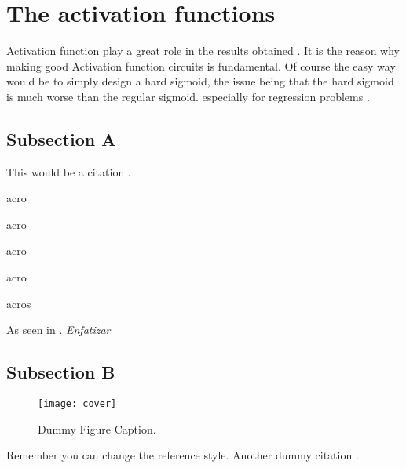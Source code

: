 \section{The activation functions}
\label{sec:af}

Activation function play a great role in the results obtained \cite{af}. It is the reason why making good Activation function circuits is fundamental. Of course the easy way would be to simply design a hard sigmoid, the issue being that the hard sigmoid is much worse than the regular sigmoid. especially for regression problems \cite{hardSigm}.

\subsection{Subsection A}
\label{subsec:subasectionA}

This would be a citation \cite{dummy}.

\ac{acro}

\acf{acro}

\acs{acro}

\acl{acro}

\acp{acro}

As seen in \cite{wiki}. \emph{Enfatizar}

\subsection{Subsection B}
\label{subsec:subbsectiona}

\begin{figure}[H]
  \centering
  \texttt{[image: cover]}
  \caption[Dummy Figure Caption for List of Figures.]{Dummy Figure Caption.}
  \label{fig:dummyfigure1}
\end{figure}

Remember you can change the reference style. Another dummy citation \cite{site}.
